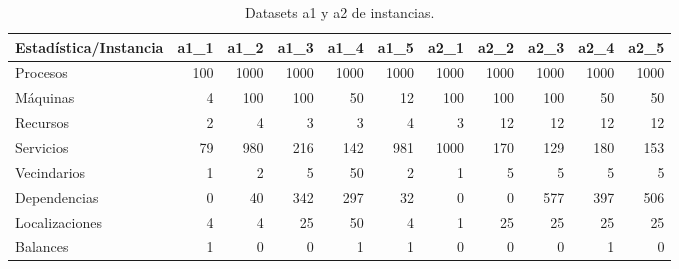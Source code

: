 \documentclass[../informe2.tex]{subfiles}
\begin{document}
\begin{table}[ht!]
	\small
	\centering
	\begin{tabular}{@{}lrrrrrrrrrr@{}}
		\toprule
		Estadística/Instancia & a1\_1 & a1\_2 & a1\_3 & a1\_4 & a1\_5 & a2\_1 & a2\_2 & a2\_3 & a2\_4 & a2\_5 \\ \midrule
		Procesos              & 100                       & 1000                      & 1000                      & 1000                      & 1000                      & 1000                      & 1000                      & 1000                      & 1000                      & 1000                      \\
		Máquinas              & 4                         & 100                       & 100                       & 50                        & 12                        & 100                       & 100                       & 100                       & 50                        & 50                        \\
		Recursos              & 2                         & 4                         & 3                         & 3                         & 4                         & 3                         & 12                        & 12                        & 12                        & 12                        \\
		Servicios             & 79                        & 980                       & 216                       & 142                       & 981                       & 1000                      & 170                       & 129                       & 180                       & 153                       \\
		Vecindarios           & 1                         & 2                         & 5                         & 50                        & 2                         & 1                         & 5                         & 5                         & 5                         & 5                         \\
		Dependencias          & 0                         & 40                        & 342                         & 297                        & 32                         & 0                         & 0                          & 577                        & 397                         & 506                        \\
		Localizaciones        & 4                         & 4                         & 25                        & 50                        & 4                         & 1                         & 25                        & 25                        & 25                        & 25                        \\
		Balances              & 1                         & 0                         & 0                         & 1                         & 1                         & 0                         & 0                         & 0                         & 1                         & 0                         \\ \bottomrule
	\end{tabular}
	\caption{\small Datasets a1 y a2 de instancias.}\label{tabla:seta}
\end{table}
\end{document}
